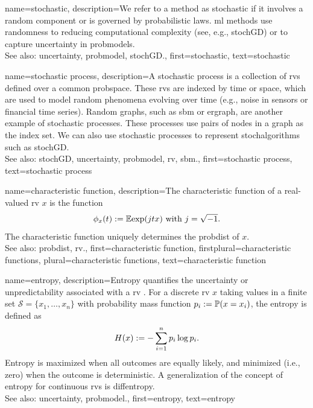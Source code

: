 {name={stochastic},
	description={We refer to a  method as stochastic if it involves a random component 
		or is governed by probabilistic laws. \Gls{ml} methods use randomness to reducing 
		computational complexity (see, e.g., \gls{stochGD}) or to capture \gls{uncertainty} in \glspl{probmodel}. 
	 \\
		See also: \gls{uncertainty}, \gls{probmodel}, \gls{stochGD}.},
	first={stochastic},
	text={stochastic}
}

{name={stochastic process},
	description={A stochastic process is a collection of \glspl{rv} defined over a common \gls{probspace}. 
		These \glspl{rv} are indexed by time or space, which are used to model random phenomena
		evolving over time (e.g., noise in sensors or financial time series). Random \glspl{graph}, 
		such as \gls{sbm} or \gls{ergraph}, are another example of stochastic processes. These processes 
		use pairs of nodes in a \gls{graph} as the index set. We can also use stochastic processes 
		to represent \glspl{stochalgorithm} such as \gls{stochGD}. 
		\\
		See also:  \gls{stochGD}, \gls{uncertainty}, \gls{probmodel}, \gls{rv}, \gls{sbm}.},
	first={stochastic process},
	text={stochastic process}
}


{name={characteristic function},
	description={The characteristic function 
		of a real-valued \gls{rv} $x$ is the function \cite[Section 26]{BillingsleyProbMeasure}
		$$ \phi_{x}(t) := \mathbb{E} { \exp(j t x) } \mbox{ with } j = \sqrt{-1}.$$
	 The characteristic function uniquely determines the \gls{probdist} of $x$. 
		\\
		See also: \gls{probdist}, \gls{rv}.},
	first={characteristic function},
	firstplural={characteristic functions}, 
	plural={characteristic functions},
	text={characteristic function}
}




{name={entropy},
  description={Entropy quantifies the \gls{uncertainty} or unpredictability associated with a \gls{rv} \cite{coverthomas}. 
		  For a discrete \gls{rv} $x$ taking values in a finite set $\mathcal{S} = \{x_1, \ldots, x_n\}$ with 
		probability mass function $p_i := \mathbb{P}({x = x_i})$, the entropy is defined as
		\[
		H(x) := -\sum_{i=1}^n p_i \log p_i.
		\]
		Entropy is maximized when all outcomes are equally likely, and minimized (i.e., zero) 
		when the outcome is deterministic. A generalization of the concept of entropy for continuous 
		\glspl{rv} is \gls{diffentropy}. 
\\
		See also: \gls{uncertainty}, \gls{probmodel}.},
	first={entropy},
	text={entropy}
}

